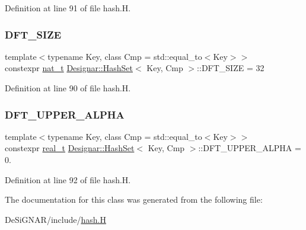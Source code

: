 Definition at line 91 of file hash.\+H.

\mbox{\label{class_designar_1_1_hash_set_a23c3da93ad9449838ab2c78526cd9dbd}} 
\subsubsection{\texorpdfstring{D\+F\+T\+\_\+\+S\+I\+ZE}{DFT\_SIZE}}
{\footnotesize\ttfamily template$<$typename Key, class Cmp = std\+::equal\+\_\+to$<$\+Key$>$$>$ \\
constexpr \hyperlink{namespace_designar_aa72662848b9f4815e7bf31a7cf3e33d1}{nat\+\_\+t} \hyperlink{class_designar_1_1_hash_set}{Designar\+::\+Hash\+Set}$<$ Key, Cmp $>$\+::D\+F\+T\+\_\+\+S\+I\+ZE = 32\hspace{0.3cm}{\ttfamily [static]}}



Definition at line 90 of file hash.\+H.

\mbox{\label{class_designar_1_1_hash_set_ab7e07181f29465aa1457e6abb9397be1}} 
\subsubsection{\texorpdfstring{D\+F\+T\+\_\+\+U\+P\+P\+E\+R\+\_\+\+A\+L\+P\+HA}{DFT\_UPPER\_ALPHA}}
{\footnotesize\ttfamily template$<$typename Key, class Cmp = std\+::equal\+\_\+to$<$\+Key$>$$>$ \\
constexpr \hyperlink{namespace_designar_aca2c32af26808dbec1f3a3071fad25ce}{real\+\_\+t} \hyperlink{class_designar_1_1_hash_set}{Designar\+::\+Hash\+Set}$<$ Key, Cmp $>$\+::D\+F\+T\+\_\+\+U\+P\+P\+E\+R\+\_\+\+A\+L\+P\+HA = 0.\hspace{0.3cm}{\ttfamily [static]}}



Definition at line 92 of file hash.\+H.



The documentation for this class was generated from the following file\+:\begin{DoxyCompactItemize}
\item 
De\+Si\+G\+N\+A\+R/include/\hyperlink{hash_8_h}{hash.\+H}\end{DoxyCompactItemize}
